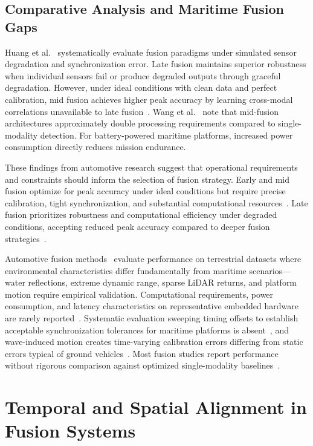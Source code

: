 \documentclass{erauthesis}
\begin{document}
\subsection{Comparative Analysis and Maritime Fusion Gaps}

Huang et al.~\cite{huang2024} systematically evaluate fusion paradigms under simulated sensor degradation and synchronization error.
Late fusion maintains superior robustness when individual sensors fail or produce degraded outputs through graceful degradation.
However, under ideal conditions with clean data and perfect calibration, mid fusion achieves higher peak accuracy by learning cross-modal correlations unavailable to late fusion~\cite{huang2024}.
Wang et al.~\cite{wang2020a} note that mid-fusion architectures approximately double processing requirements compared to single-modality detection.
For battery-powered maritime platforms, increased power consumption directly reduces mission endurance.

These findings from automotive research suggest that operational requirements and constraints should inform the selection of fusion strategy.
Early and mid fusion optimize for peak accuracy under ideal conditions but require precise calibration, tight synchronization, and substantial computational resources~\cite{feng2021, cui2022}.
Late fusion prioritizes robustness and computational efficiency under degraded conditions, accepting reduced peak accuracy compared to deeper fusion strategies~\cite{huang2024, wang2020a}.

Automotive fusion methods~\cite{feng2021, cui2022, huang2024} evaluate performance on terrestrial datasets where environmental characteristics differ fundamentally from maritime scenarios—water reflections, extreme dynamic range, sparse \ac{LiDAR} returns, and platform motion require empirical validation.
Computational requirements, power consumption, and latency characteristics on representative embedded hardware are rarely reported~\cite{liu2023a}.
Systematic evaluation sweeping timing offsets to establish acceptable synchronization tolerances for maritime platforms is absent~\cite{huang2024}, and wave-induced motion creates time-varying calibration errors differing from static errors typical of ground vehicles~\cite{cui2022}.
Most fusion studies report performance without rigorous comparison against optimized single-modality baselines~\cite{farahnakian2020, haghbayan2018, clunie2021}.

\section{Temporal and Spatial Alignment in Fusion Systems}
\end{document}
